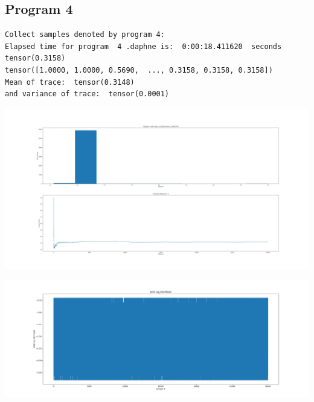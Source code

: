 \documentclass[]{article}
\begin{document}
\subsection{Program 4}
\begin{verbatim}
Collect samples denoted by program 4:
Elapsed time for program  4 .daphne is:  0:00:18.411620  seconds
tensor(0.3158)
tensor([1.0000, 1.0000, 0.5690,  ..., 0.3158, 0.3158, 0.3158])
Mean of trace:  tensor(0.3148)  
and variance of trace:  tensor(0.0001)
\end{verbatim}
\begin{center}
	\includegraphics[width=\linewidth]{Figures/p4_IS.png}
\end{center}
\begin{center}
	\includegraphics[width=\linewidth]{Figures/p4_ISjll.png}
\end{center}
\end{document}
